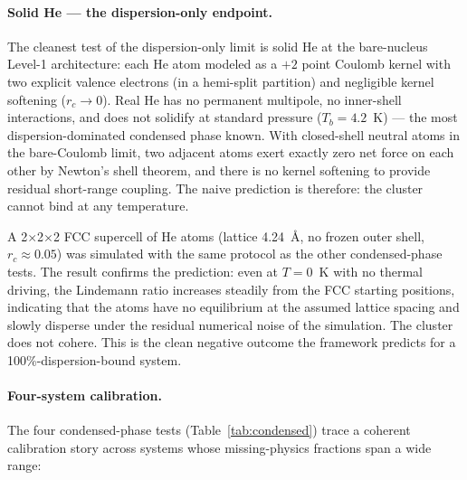 \documentclass[11pt]{article}
\begin{document}
\paragraph{Solid He --- the dispersion-only endpoint.}
The cleanest test of the dispersion-only limit is solid He at the bare-nucleus Level-1 architecture: each He atom modeled as a $+2$ point Coulomb kernel with two explicit valence electrons (in a hemi-split partition) and negligible kernel softening ($r_c \to 0$). Real He has no permanent multipole, no inner-shell interactions, and does not solidify at standard pressure ($T_b = 4.2$~K) --- the most dispersion-dominated condensed phase known. With closed-shell neutral atoms in the bare-Coulomb limit, two adjacent atoms exert exactly zero net force on each other by Newton's shell theorem, and there is no kernel softening to provide residual short-range coupling. The naive prediction is therefore: the cluster cannot bind at any temperature.

A 2$\times$2$\times$2 FCC supercell of He atoms (lattice 4.24~\AA, no frozen outer shell, $r_c \approx 0.05$) was simulated with the same protocol as the other condensed-phase tests. The result confirms the prediction: even at $T = 0$~K with no thermal driving, the Lindemann ratio increases steadily from the FCC starting positions, indicating that the atoms have no equilibrium at the assumed lattice spacing and slowly disperse under the residual numerical noise of the simulation. The cluster does not cohere. This is the clean negative outcome the framework predicts for a 100\%-dispersion-bound system.

\paragraph{Four-system calibration.}
The four condensed-phase tests (Table~\ref{tab:condensed}) trace a coherent calibration story across systems whose missing-physics fractions span a wide range:
\end{document}
